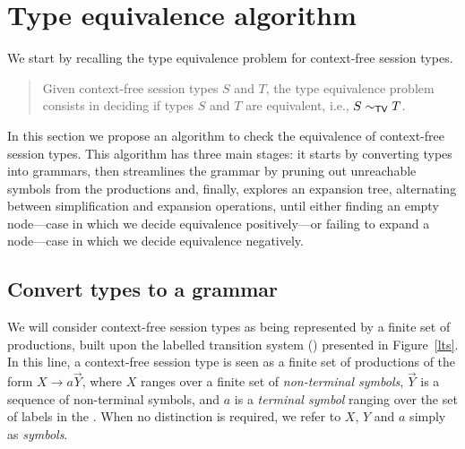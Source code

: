\section{Type equivalence algorithm}
\label{sec:algorithm}

We start by recalling the type equivalence problem for context-free
session types.

\begin{quote}
  Given context-free session types $S$ and $T$, the type equivalence
  problem consists in deciding if types $S$ and $T$ are equivalent,
  i.e., $S \sim_{\mathsf{TV}} T$.
\end{quote}

In this section we propose an algorithm to check the equivalence of
context-free session types. This algorithm has three main stages:
it starts by converting types into grammars, then streamlines the grammar
by pruning out unreachable symbols from the productions and, finally,
explores an expansion tree, alternating
between simplification and expansion operations, until either finding
an empty node---case in which we decide equivalence positively---or
failing to expand a node---case in which we decide equivalence negatively.

\subsection{Convert types to a grammar}
\label{subsec:typeToGrammar}

We will consider context-free session types as being represented by a
finite set of productions, built upon the labelled transition system (\LTS)
presented in Figure~\ref{lts}. In this line, a context-free session type
is seen as a finite set of productions of the form $X\rightarrow a \vec Y$,
where $X$ ranges over a finite set of \emph{non-terminal symbols}, $\vec Y$
is a sequence of non-terminal symbols, and $a$ is a \emph{terminal symbol}
ranging over the set of labels in the \LTS. When no distinction is required,
we refer to $X$, $Y$ and $a$ simply as \emph{symbols}.

